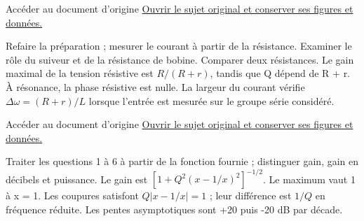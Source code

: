 \begin{loi}{Accéder au document d’origine}
\href{https://mpsi.schleck.ovh/fichiers/tp/tp12_rlc_rsf.pdf}{Ouvrir le sujet original et conserver ses figures et données.}
\end{loi}
Refaire la préparation ; mesurer le courant à partir de la résistance. Examiner le rôle du suiveur et de la résistance de bobine. Comparer deux résistances.
Le gain maximal de la tension résistive est $R/(R+r)$, tandis que Q dépend de R + r. À résonance, la phase résistive est nulle. La largeur du courant vérifie $\Delta\omega=(R+r)/L$ lorsque l’entrée est mesurée sur le groupe série considéré.

\begin{loi}{Accéder au document d’origine}
\href{https://mpsi.schleck.ovh/fichiers/td/td7_filtrage_lineaire.pdf}{Ouvrir le sujet original et conserver ses figures et données.}
\end{loi}
Traiter les questions 1 à 6 à partir de la fonction fournie ; distinguer gain, gain en décibels et puissance.
Le gain est $[1+Q^2(x-1/x)^2]^{-1/2}$. Le maximum vaut 1 à x = 1. Les coupures satisfont $Q|x-1/x|=1$ ; leur différence est $1/Q$ en fréquence réduite. Les pentes asymptotiques sont +20 puis -20 dB par décade.

